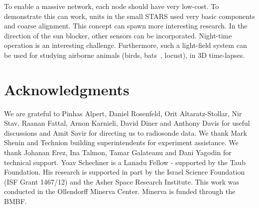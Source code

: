\documentclass[runningheads]{llncs}
\begin{document}
To enable a massive network, each node should have very low-cost. To demonstrate this can work, units in the small STARS used very basic components and coarse alignment. This concept can spawn more interesting research. In the direction of the sun blocker, other sensors can be incorporated. Night-time operation is an interesting challenge. Furthermore, such a light-field system can be used for studying airborne animals (birds, bats~\cite{bats2010}, locust), in 3D time-lapses.


\section{Acknowledgments}
\label{sec:acknow}
We are grateful to Pinhas Alpert, Daniel Rosenfeld, Orit Altaratz-Stollar, Nir Stav, Raanan Fattal, Arnon Karnieli, David Diner and Anthony Davis for useful discussions and Amit Savir for directing us to radiosonde data. We thank Mark Shenin and Technion building superintendents for experiment assistance. We thank Johanan Erez, Ina Talmon, Tamar Galateanu and Dani Yagodin for technical support. Yoav Schechner is a Lanadu Fellow - supported by the Taub Foundation. His research is supported in part by the Israel Science Foundation (ISF Grant 1467/12) and the Asher Space Research Institute. This work was conducted in the Ollendorff Minerva Center. Minerva is funded through the BMBF.
\end{document}
